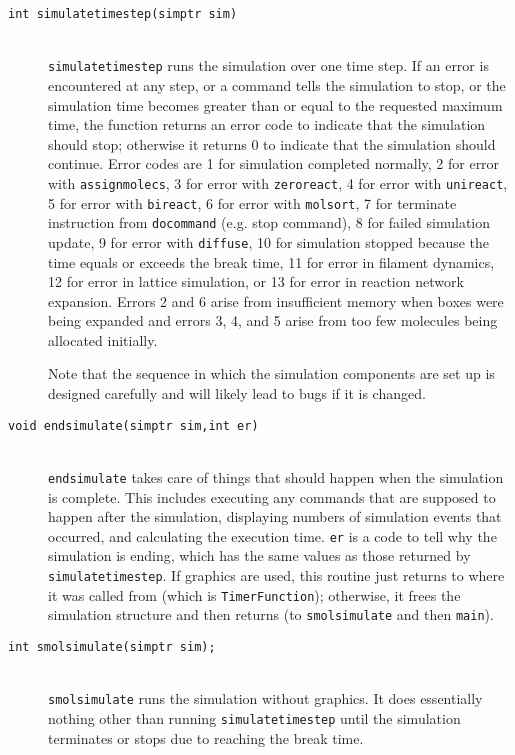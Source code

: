 \documentclass {book}
\begin{document}
\begin{description}
\item[\texttt{int simulatetimestep(simptr sim)}]
\hfill \\
\texttt{simulatetimestep} runs the simulation over one time step.  If an error is encountered at any step, or a command tells the simulation to stop, or the simulation time becomes greater than or equal to the requested maximum time, the function returns an error code to indicate that the simulation should stop; otherwise it returns 0 to indicate that the simulation should continue.  Error codes are 1 for simulation completed normally, 2 for error with \texttt{assignmolecs}, 3 for error with \texttt{zeroreact}, 4 for error with \texttt{unireact}, 5 for error with \texttt{bireact}, 6 for error with \texttt{molsort}, 7 for terminate instruction from \texttt{docommand} (e.g. stop command), 8 for failed simulation update, 9 for error with \texttt{diffuse}, 10 for simulation stopped because the time equals or exceeds the break time, 11 for error in filament dynamics, 12 for error in lattice simulation, or 13 for error in reaction network expansion.  Errors 2 and 6 arise from insufficient memory when boxes were being expanded and errors 3, 4, and 5 arise from too few molecules being allocated initially.

Note that the sequence in which the simulation components are set up is designed carefully and will likely lead to bugs if it is changed.

\item[\texttt{void endsimulate(simptr sim,int er)}]
\hfill \\
\texttt{endsimulate} takes care of things that should happen when the simulation is complete.  This includes executing any commands that are supposed to happen after the simulation, displaying numbers of simulation events that occurred, and calculating the execution time.  \texttt{er} is a code to tell why the simulation is ending, which has the same values as those returned by \texttt{simulatetimestep}.  If graphics are used, this routine just returns to where it was called from (which is \texttt{TimerFunction}); otherwise, it frees the simulation structure and then returns (to \texttt{smolsimulate} and then \texttt{main}).

\item[\texttt{int smolsimulate(simptr sim);}]
\hfill \\
\texttt{smolsimulate} runs the simulation without graphics.  It does essentially nothing other than running \texttt{simulatetimestep} until the simulation terminates or stops due to reaching the break time.

\end{description}
\end{document}
